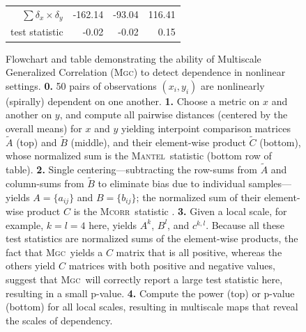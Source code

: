 \documentclass[11pt]{article}
\providecommand{\sct}[1]{{\normalfont\textsc{#1}}}
\newcommand{\G}{c}
\newcommand{\Mgc}{\sct{Mgc}}
\newcommand{\Mcorr}{\sct{Mcorr}}
\newcommand{\Mantel}{\sct{Mantel}}
\begin{document}
\begin{figure}[htbp]
\begin{tabular}{r  r   r   r}
\hline
 $\sum{\delta_x \times \delta_y}$ & \color{magenta}-162.14   & \color{magenta}-93.04 & \color{green}116.41  \\ 
 test statistic &  \color{magenta}-0.02  & \color{magenta}-0.02 & \color{green}0.15  \\  
\end{tabular}
\caption{
Flowchart  and table demonstrating the ability of Multiscale Generalized Correlation (\Mgc) to detect dependence in nonlinear settings. 
%
%
%
\textbf{0.} 50 pairs of observations $(x_i,y_i)$ are nonlinearly (spirally) dependent on one another.
% 
\textbf{1.} Choose a metric on $x$ and another on $y$, and compute all pairwise distances (centered by the overall means) for $x$ and $y$ yielding interpoint comparison matrices
 $\tilde{A}$ (top) and $\tilde{B}$ (middle), 
and their element-wise product $\tilde{C}$ (bottom), whose normalized sum is the  \Mantel~statistic \cite{Mantel1967} (bottom row of table).
% 
\textbf{2.} Single centering---subtracting the row-sums from $\tilde{A}$ and column-sums from $\tilde{B}$ to eliminate bias due to individual samples---yields $A=\{a_{ij}\}$ and $B=\{b_{ij}\}$; the normalized sum of their  element-wise product  $C$ is the  \Mcorr~statistic \cite{SzekelyRizzo2013a}.
% 
\textbf{3.} Given a local scale, for example, $k=l=4$ here, yields $A^{k}$, $B^{l}$, and $\G^{k,l}$.  Because all these test statistics are normalized sums of the element-wise products, the fact that \Mgc~yields a $C$ matrix that is all positive, whereas the others yield $C$ matrices with both positive and negative values, suggest that \Mgc~will correctly report a large test statistic here, resulting in a small p-value.
\textbf{4.} Compute the power (top) or p-value (bottom) for all local scales, resulting in multiscale maps that reveal the  scales of dependency. 
}
\end{figure}
\end{document}
